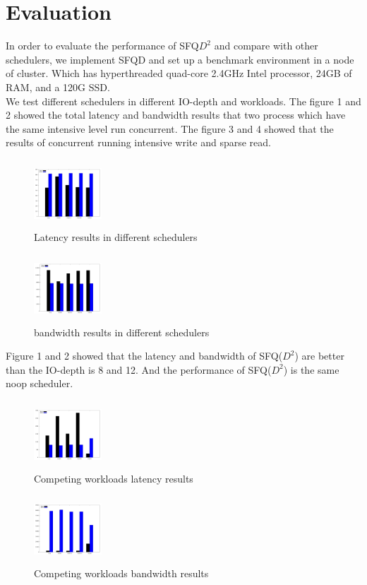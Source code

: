 \section{Evaluation}
In order to evaluate the performance of SFQ$D^2$ and compare with other schedulers, 
we implement SFQD and set up a benchmark environment in a node of cluster. Which has
hyperthreaded quad-core 2.4GHz Intel processor, 24GB of RAM, and a 120G SSD.\\
We test different schedulers in different IO-depth and workloads. The figure 1 and 2
showed the total latency and bandwidth results that two process which have the same
intensive level run concurrent. The figure 3 and 4 showed that the results of concurrent
running intensive write and sparse read.\\

\begin{figure}[h!]
	\includegraphics[width=1in,height=1in]{./image/lat_same}
	\left
	\caption{Latency results in different schedulers}
\end{figure}
\begin{figure}[h!]
	\includegraphics[width=1in,height=1in]{./image/bw_same}
	\centering
	\caption{bandwidth results in different schedulers}
\end{figure}

Figure 1 and 2 showed that the latency and bandwidth of SFQ($D^2$) are better than
the IO-depth is 8 and 12. And the performance of SFQ($D^2$) is the same noop scheduler.\\


\begin{figure}[h!]
	\includegraphics[width=1in,height=1in]{./image/lat_sparse}
	\centering
	\caption{Competing workloads latency results}
\end{figure}
\begin{figure}[h!]
	\includegraphics[width=1in,height=1in]{./image/bw_sparse}
	\centering
	\caption{Competing workloads bandwidth results}
\end{figure}

